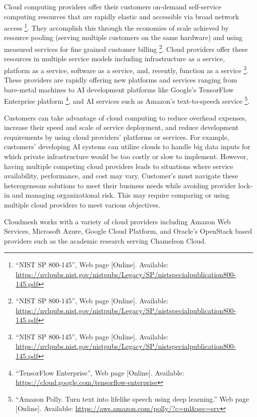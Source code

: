 Cloud computing providers offer their customers on-demand self-service
computing resources that are rapidly elastic and accessible via broad
network access \footnote{``NIST SP 800-145'', Web page {[}Online{]}.
  Available:
  \url{https://nvlpubs.nist.gov/nistpubs/Legacy/SP/nistspecialpublication800-145.pdf}}.
They accomplish this through the economies of scale achieved by resource
pooling (serving multiple customers on the same hardware) and using
measured services for fine grained customer billing \footnote{``NIST SP
  800-145'', Web page {[}Online{]}. Available:
  \url{https://nvlpubs.nist.gov/nistpubs/Legacy/SP/nistspecialpublication800-145.pdf}}.
Cloud providers offer these resources in multiple service models
including infrastructure as a service, platform as a service, software
as a service, and, recently, function as a service \footnote{``NIST SP
  800-145'', Web page {[}Online{]}. Available:
  \url{https://nvlpubs.nist.gov/nistpubs/Legacy/SP/nistspecialpublication800-145.pdf}}.
These providers are rapidly offering new platforms and services ranging
from bare-metal machines to AI development platforms like Google's
TensorFlow Enterprise platform \footnote{``TensorFlow Enterprise'', Web
  page {[}Online{]}. Available:
  \url{https://cloud.google.com/tensorflow-enterprise}}, and AI services
such as Amazon's text-to-speech service \footnote{``Amazon Polly. Turn
  text into lifelike speech using deep learning.'' Web page
  {[}Online{]}. Available:
  \url{https://aws.amazon.com/polly/?c=ml\&sec=srv}}.

Customers can take advantage of cloud computing to reduce overhead
expenses, increase their speed and scale of service deployment, and
reduce development requirements by using cloud providers' platforms or
services. For example, customers' developing AI systems can utilize
clouds to handle big data inputs for which private infrastructure would
be too costly or slow to implement. However, having multiple competing
cloud providers leads to situations where service availability,
performance, and cost may vary. Customer's must navigate these
heterogeneous solutions to meet their business needs while avoiding
provider lock-in and managing organizational risk. This may require
comparing or using multiple cloud providers to meet various objectives.

Cloudmesh works with a variety of cloud providers including Amazon Web
Services, Microsoft Azure, Google Cloud Platform, and Oracle's OpenStack
based providers such as the academic research serving Chameleon Cloud.

